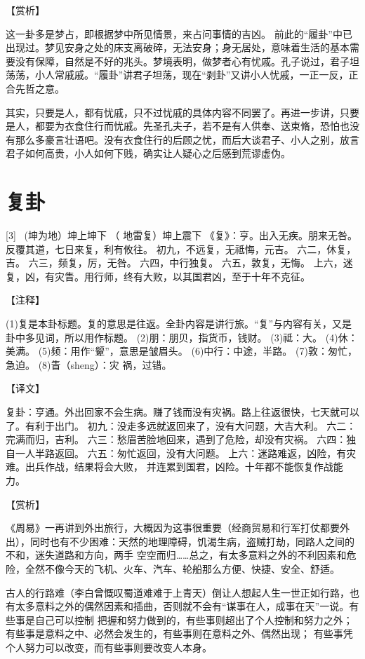 \documentclass[12pt,UTF8]{ctexbook}
\begin{document}
【赏析】

这一卦多是梦占，即根据梦中所见情景，来占问事情的吉凶。 前此的“履卦”中已出现过。梦见安身之处的床支离破碎，无法安身；身无居处，意味着生活的基本需要没有保障，自然是不好的兆头。梦境表明，做梦者心有忧戚。孔子说过，君子坦荡荡，小人常戚戚。“履卦”讲君子坦荡，现在“剥卦”又讲小人忧戚，一正一反，正合先哲之意。

其实，只要是人，都有忧戚，只不过忧戚的具体内容不同罢了。再进一步讲，只要是人，都要为衣食住行而忧戚。先圣孔夫子，若不是有人供奉、送束脩，恐怕也没有那么多豪言壮语吧。没有衣食住行的后顾之忧，而后大谈君子、小人之别，放言君子如何高贵，小人如何下贱，确实让人疑心之后感到荒谬虚伪。
\chapter{复卦}

[3] \ (坤为地）坤上坤下
（ 地雷复）坤上震下
《复》：亨。出入无疾。朋来无咎。反覆其道，七日来复，利有攸往。
初九，不远复，无祗悔，元吉。
六二，休复，吉。
六三，频复，厉，无咎。
六四，中行独复。
六五，敦复，无悔。
上六，迷复，凶，有灾眚。用行师，终有大败，以其国君凶，至于十年不克征。

【注释】

(1)复是本卦标题。复的意思是往返。全卦内容是讲行旅。“复”与内容有关，又是卦中多见词，所以用作标题。
(2)朋：朋贝，指货币，钱财。
(3)祗：大。
(4)休：美满。
(5)频：用作“颦”，意思是皱眉头。
(6)中行：中途，半路。
(7)敦：匆忙，急迫。
(8)眚（sheng）：灾 祸，过错。

【译文】

复卦：亨通。外出回家不会生病。赚了钱而没有灾祸。路上往返很快，七天就可以了。有利于出门。
初九：没走多远就返回来了，没有大问题，大吉大利。
六二：完满而归，吉利。
六三：愁眉苦脸地回来，遇到了危险，却没有灾祸。
六四：独自一人半路返回。
六五：匆忙返回，没有大问题。
上六：迷路难返，凶险，有灾难。出兵作战，结果将会大败， 并连累到国君，凶险。十年都不能恢复作战能力。

【赏析】

《周易》一再讲到外出旅行，大概因为这事很重要（经商贸易和行军打仗都要外出），同时也有不少困难：天然的地理障碍，饥渴生病，盗贼打劫，同路人之间的不和，迷失道路和方向，两手 空空而归……总之，有太多意料之外的不利因素和危险，全然不像今天的飞机、火车、汽车、轮船那么方便、快捷、安全、舒适。

古人的行路难（李白曾慨叹蜀道难难于上青天）倒让人想起人生一世正如行路，也有太多意料之外的偶然因素和插曲，否则就不会有“谋事在人，成事在天”一说。有些事是自己可以控制 把握和努力做到的，有些事则超出了个人控制和努力之外；有些事是意料之中、必然会发生的，有些事则在意料之外、偶然出现； 有些事凭个人努力可以改变，而有些事则要改变人本身。
\end{document}
